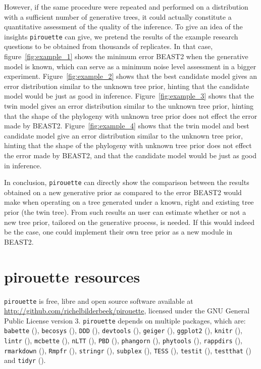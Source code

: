 \documentclass{article}
\begin{document}
However, if the same procedure were repeated and performed on a distribution 
with a sufficient number of generative trees, 
it could actually constitute a quantitative assessment 
of the quality of the inference.
To give an idea of the insights \verb;pirouette; can give,
we pretend the results of the example research questions
to be obtained from thousands of replicates.
In that case, figure~\ref{fig:example_1} shows 
the minimum error BEAST2 when the
generative model is known, which can serve as 
a minimum noise level assessment in a bigger experiment.  
Figure~\ref{fig:example_2} shows that 
the best candidate model gives an error distribution similar to the unknown 
tree prior,
hinting that the candidate model would be just as good in inference.
Figure~\ref{fig:example_3} shows that 
the twin model gives an error distribution similar to the unknown tree prior,
hinting that the shape of the phylogeny with unknown tree prior
does not effect the error made by BEAST2.
Figure~\ref{fig:example_4} shows that 
the twin model and best candidate model give 
an error distribution similar to the unknown tree prior,
hinting that the shape of the phylogeny with unknown tree prior
does not effect the error made by BEAST2, 
and that the candidate model would be just as good in inference.

In conclusion, \verb;pirouette; can directly show 
the comparison between the results obtained 
on a new generative prior as compared to the error BEAST2 
would make when operating on a tree generated 
under a known, right and existing tree prior (the twin tree).
From such results an user can estimate whether or not a new tree prior, 
tailored on the generative process, is needed. 
If this would indeed be the case, 
one could implement their own tree prior as a new module in BEAST2.

\section{pirouette resources}

\verb;pirouette; is free, libre and open source software available at 
\url{http://github.com/richelbilderbeek/pirouette},
licensed under the GNU General Public License version 3.
\verb;pirouette; depends on multiple packages, which are:
\verb;babette; (\cite{bilderbeek2018babette}),
\verb;becosys; (\cite{becosys}),
\verb;DDD; (\cite{DDD}),
\verb;devtools; (\cite{devtools}),
\verb;geiger; (\cite{geiger}),
\verb;ggplot2; (\cite{ggplot2}),
\verb;knitr; (\cite{knitr}),
\verb;lintr; (\cite{lintr}),
\verb;mcbette; (\cite{mcbette}),
\verb;nLTT; (\cite{nLTT}),
\verb;PBD; (\cite{PBD}),
\verb;phangorn; (\cite{phangorn}),
\verb;phytools; (\cite{phytools}),
\verb;rappdirs; (\cite{rappdirs}),
\verb;rmarkdown; (\cite{rmarkdown}),
\verb;Rmpfr; (\cite{Rmpfr}),
\verb;stringr; (\cite{stringr}),
\verb;subplex; (\cite{subplex}),
\verb;TESS; (\cite{TESS}),
\verb;testit; (\cite{testit}), 
\verb;testthat; (\cite{testthat}) and
\verb;tidyr; (\cite{tidyr}).
\end{document}
